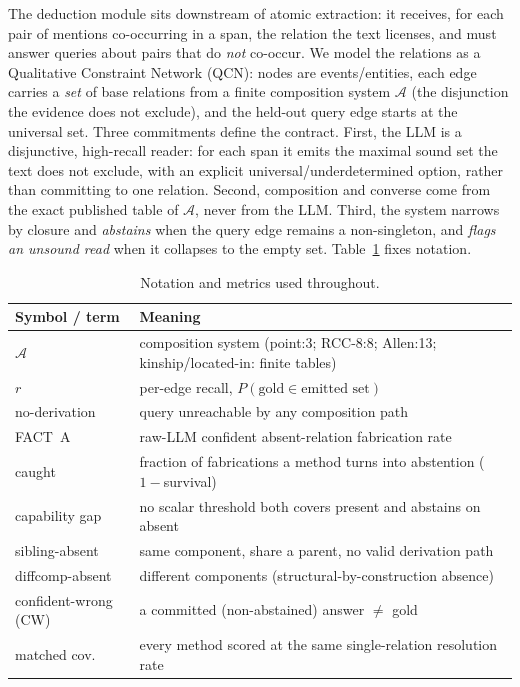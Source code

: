 \documentclass[11pt,letterpaper]{article}
\begin{document}
The deduction module sits downstream of atomic extraction: it receives, for each pair of mentions co-occurring in a span, the relation the text licenses, and must answer queries about pairs that do \emph{not} co-occur. We model the relations as a Qualitative Constraint Network (QCN): nodes are events/entities, each edge carries a \emph{set} of base relations from a finite composition system $\mathcal{A}$ (the disjunction the evidence does not exclude), and the held-out query edge starts at the universal set. Three commitments define the contract. First, the LLM is a disjunctive, high-recall reader: for each span it emits the maximal sound set the text does not exclude, with an explicit universal/underdetermined option, rather than committing to one relation. Second, composition and converse come from the exact published table of $\mathcal{A}$, never from the LLM. Third, the system narrows by closure and \emph{abstains} when the query edge remains a non-singleton, and \emph{flags an unsound read} when it collapses to the empty set. Table~\ref{tab:notation} fixes notation.

\begin{table}[t]
\centering
\small
\begin{tabular}{ll}
\hline
Symbol / term & Meaning \\
\hline
$\mathcal{A}$ & composition system (point:3; RCC-8:8; Allen:13; kinship/located-in: finite tables) \\
$r$ & per-edge recall, $P(\text{gold}\in\text{emitted set})$ \\
no-derivation & query unreachable by any composition path \\
FACT~A & raw-LLM confident absent-relation fabrication rate \\
caught & fraction of fabrications a method turns into abstention ($1-$survival) \\
capability gap & no scalar threshold both covers present and abstains on absent \\
sibling-absent & same component, share a parent, no valid derivation path \\
diffcomp-absent & different components (structural-by-construction absence) \\
confident-wrong (CW) & a committed (non-abstained) answer $\neq$ gold \\
matched cov. & every method scored at the same single-relation resolution rate \\
\hline
\end{tabular}
\caption{Notation and metrics used throughout.}
\label{tab:notation}
\end{table}
\end{document}
